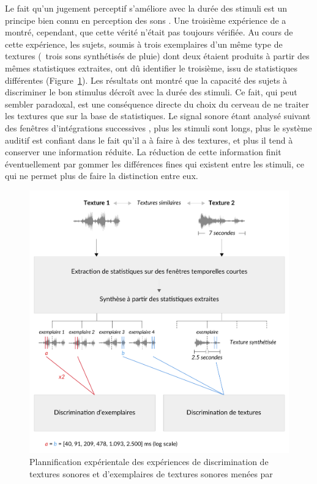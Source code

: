 Le fait qu'un jugement perceptif s'améliore avec la durée des stimuli est un principe bien connu en perception des sons \citep{moore1973frequency}. Une troisième expérience de \citep{mcdermott2013summary} a montré, cependant, que cette vérité n'était pas toujours vérifiée. Au cours de cette expérience, les sujets, soumis à trois exemplaires d'un même type de textures (\eg~trois sons synthétisés de pluie) dont deux étaient produits à partir des mêmes statistiques extraites, ont dû identifier le troisième, issu de statistiques différentes (Figure~\ref{fig:textureMcder}). Les résultats ont montré que la capacité des sujets à discriminer le bon stimulus décroît avec la durée des stimuli. Ce fait, qui peut sembler paradoxal, est une conséquence directe du choix du cerveau de ne traiter les textures que sur la base de statistiques. Le signal sonore étant analysé suivant des fenêtres d'intégrations successives \citep{yabe1998temporal,poeppel2003analysis}, plus les stimuli sont longs, plus le système auditif est confiant dans le fait qu'il a à faire à des textures, et plus il tend à conserver une information réduite. La réduction de cette information finit éventuellement par gommer les différences fines qui existent entre les stimuli, ce qui ne permet plus de faire la distinction entre eux.


\begin{figure}[t]
        \myfloatalign
        \includegraphics[width=.8\linewidth]{gfx/ch_3/mcder}
        \caption[Plannification expérimentale de l'expérience de discrimination de textures sonores et d'exemplaires de textures sonores]{Plannification expérientale des expériences de discrimination de textures sonores et d'exemplaires de textures sonores menées par \citep{mcdermott2013summary}}\label{fig:textureMcder}
\end{figure}

